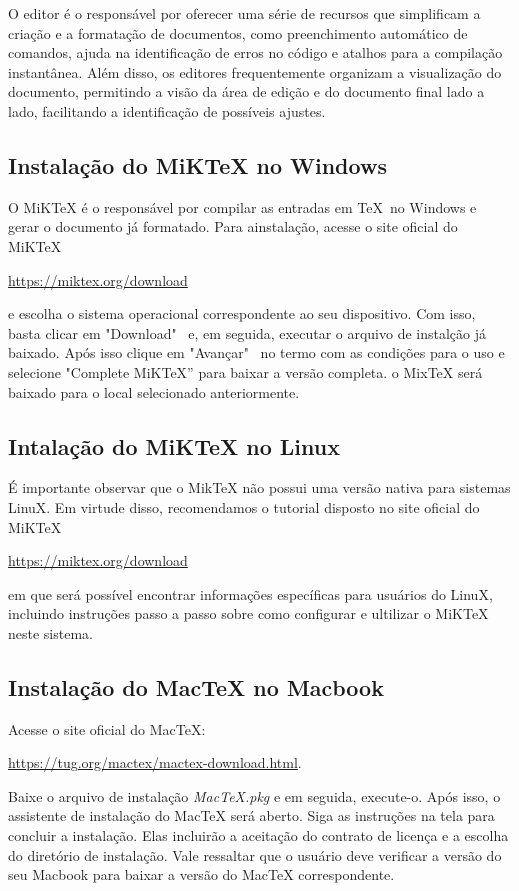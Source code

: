 \noindent O editor \'e o respons\'avel por oferecer uma s\'erie de recursos que simplificam a cria\c c\~ao e a formata\c c\~ao de documentos, como preenchimento autom\'atico de comandos, ajuda na identifica\c c\~ao de erros no c\'odigo e atalhos para a compila\c c\~ao instant\^anea. Al\'em disso, os editores frequentemente organizam a visualiza\c c\~ao do documento, permitindo a vis\~ao da \'area de edi\c c\~ao e do documento final lado a lado, facilitando a identifica\c c\~ao de poss\'iveis ajustes.

\subsection{Instala\c c\~ao do MiKTeX no Windows}

\noindent O MiKTeX \'e o respons\'avel por compilar as entradas em \TeX\ no Windows e gerar o documento j\'a formatado. Para ainstalação, acesse o site oficial do MiKTeX 
\begin{center}
\url{https://miktex.org/download}
\end{center}

\noindent e escolha o sistema operacional correspondente ao seu dispositivo. Com isso, basta clicar em "Download" \ e, em seguida, executar o arquivo de instal\c c\~ao j\'a baixado.
\noindent Ap\'os isso clique em "Avan\c car" \ no termo com as condições para o uso e  selecione "Complete MiKTeX” para baixar a versão completa. o MixTeX será baixado para o local selecionado anteriormente.
\subsection{Intala\c c\~ao do MiKTeX no Linux}
\noindent \'E importante observar que o MikTeX n\~ao possui uma vers\~ao nativa para sistemas LinuX. Em virtude disso, recomendamos o tutorial disposto no site oficial do MiKTeX
\begin{center}
\url{https://miktex.org/download}
\end{center}
em que ser\'a poss\'ivel encontrar informa\c c\~oes espec\'ificas para usu\'arios do LinuX, incluindo instru\c c\~oes passo a passo sobre como configurar e ultilizar o MiKTeX neste sistema.
\subsection{Instala\c c\~ao do MacTeX no Macbook}
\noindent Acesse o site oficial do MacTeX:
\begin{center}
\url{https://tug.org/mactex/mactex-download.html}.   
\end{center}
Baixe o arquivo de instala\c c\~ao \textit{MacTeX.pkg} e em seguida, execute-o. Ap\'os isso, o assistente de instalação do MacTeX será aberto. Siga as instruções na tela para concluir a instalação. Elas incluirão a aceitação do contrato de licença e a escolha do diretório de instalação. Vale ressaltar que o usu\'ario deve verificar a vers\~ao do seu Macbook para baixar a vers\~ao do MacTeX correspondente.

